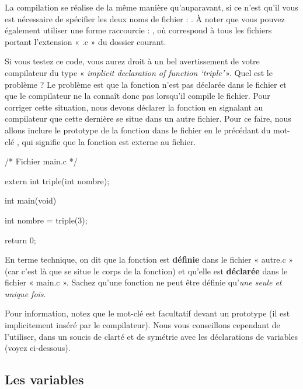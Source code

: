 La compilation se réalise de la même manière qu'auparavant, si ce n'est
qu'il vous est nécessaire de spécifier les deux noms de fichier :
. À noter que vous pouvez également
utiliser une forme raccourcie : , où 
correspond à tous les fichiers portant l'extension « .c » du dossier
courant.

Si vous testez ce code, vous aurez droit à un bel avertissement de votre
compilateur du type « \emph{implicit declaration of function
`triple'} ». Quel est le problème ? Le problème est que la fonction
 n'est pas déclarée dans le fichier  et
que le compilateur ne la connaît donc pas lorsqu'il compile le fichier.
Pour corriger cette situation, nous devons déclarer la fonction en
signalant au compilateur que cette dernière se situe dans un autre
fichier. Pour ce faire, nous allons inclure le prototype de la fonction
 dans le fichier  en le précédant du
mot-clé , qui signifie que la fonction est externe au
fichier.

\begin{C}
/* Fichier autre.c */

int triple(int nombre)
{
    return nombre * 3;

\end{C}

\begin{C}
/* Fichier main.c */

extern int triple(int nombre);

int main(void)
{
    int nombre = triple(3);

    return 0;
}
\end{C}

En terme technique, on dit que la fonction  est
\textbf{définie} dans le fichier « autre.c » (car c'est là que se situe
le corps de la fonction) et qu'elle est \textbf{déclarée} dans le
fichier « main.c ». Sachez qu'une fonction ne peut être définie
qu'\emph{une seule et unique fois}.

Pour information, notez que le mot-clé  est facultatif
devant un prototype (il est implicitement inséré par le compilateur).
Nous vous conseillons cependant de l'utiliser, dans un soucis de clarté
et de symétrie avec les déclarations de variables (voyez ci-dessous).

\subsection{Les variables}
\label{les-variables-2}

